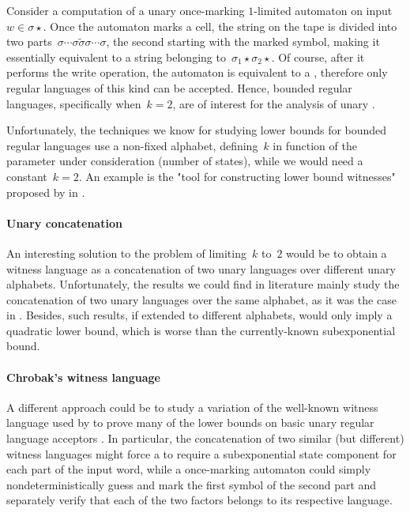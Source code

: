 Consider a computation of a unary once-marking $1$-limited automaton on input~$w\in\sigma\star$.
Once the automaton marks a cell, the string on the tape is divided into two parts~$\sigma\cdots\sigma \tilde\sigma \sigma\cdots\sigma$, the second starting with the marked symbol, making it essentially equivalent to a string belonging to~$\sigma_1\star\sigma_2\star$.
Of course, after it performs the write operation, the automaton is equivalent to a \TNFA, therefore only regular languages of this kind can be accepted.
Hence, bounded regular languages, specifically when~$k=2$, are of interest for the analysis of unary \OMOLAs.

Unfortunately, the techniques we know for studying lower bounds for bounded regular languages use a non-fixed alphabet, defining~$k$ in function of the parameter under consideration (number of states), while we would need a constant~$k=2$.
An example is the "tool for constructing lower bound witnesses" proposed by \citeauthor{HerKut+17} in \cite{HerKut+17}.

\paragraph{Unary concatenation} An interesting solution to the problem of limiting~$k$ to~$2$ would be to obtain a witness language as a concatenation of two unary languages over different unary alphabets.
Unfortunately, the results we could find in literature mainly study the concatenation of two unary languages over the same alphabet, as it was the case in \cite{YuZhu+94,PigSha02}.
Besides, such results, if extended to different alphabets, would only imply a quadratic lower bound, which is worse than the currently-known subexponential bound.

\paragraph{Chrobak's witness language} A different approach could be to study a variation of the well-known witness language used by \citeauthor{Chr86} to prove many of the lower bounds on basic unary regular language acceptors \cite{Chr86}.
In particular, the concatenation of two similar (but different) witness languages might force a \ODFA to require a subexponential state component for each part of the input word, while a once-marking automaton could simply nondeterministically guess and mark the first symbol of the second part and separately verify that each of the two factors belongs to its respective language.


